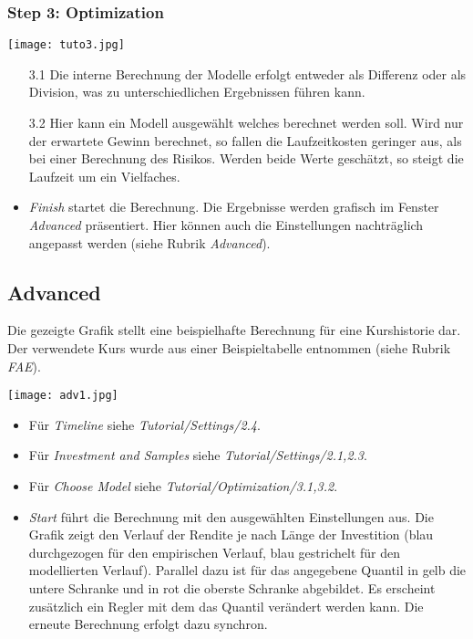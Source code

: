 \documentclass{scrartcl}
\begin{document}
\subsubsection*{Step 3: Optimization}
\begin{center}
\texttt{[image: tuto3.jpg]}
\end{center}

\begin{itemize}
\item[3.1]{Die interne Berechnung der Modelle erfolgt entweder als Differenz oder als Division, was zu unterschiedlichen Ergebnissen führen kann.}
\item[3.2]{Hier kann ein Modell ausgewählt welches berechnet werden soll. Wird nur der erwartete Gewinn berechnet, so fallen die Laufzeitkosten geringer aus, als bei einer Berechnung des Risikos. Werden beide Werte geschätzt, so steigt die Laufzeit um ein Vielfaches.}
\item{\textit{Finish} startet die Berechnung. Die Ergebnisse werden grafisch im Fenster \textit{Advanced} präsentiert. Hier können auch die Einstellungen nachträglich angepasst werden (siehe Rubrik \textit{Advanced}).}
\end{itemize}

\subsection{Advanced}

Die gezeigte Grafik stellt eine beispielhafte Berechnung für eine Kurshistorie dar. Der verwendete Kurs wurde aus einer Beispieltabelle entnommen (siehe Rubrik \textit{FAE}).

\begin{center}
\texttt{[image: adv1.jpg]}
\end{center}

\begin{itemize}
\item{Für \textit{Timeline} siehe \textit{Tutorial/Settings/2.4}.}
\item{Für \textit{Investment and Samples} siehe \textit{Tutorial/Settings/2.1,2.3}.}
\item{Für \textit{Choose Model} siehe \textit{Tutorial/Optimization/3.1,3.2}.}
\item{\textit{Start} führt die Berechnung mit den ausgewählten Einstellungen aus. Die Grafik zeigt den Verlauf der Rendite je nach Länge der Investition (blau durchgezogen für den empirischen Verlauf, blau gestrichelt für den modellierten Verlauf). Parallel dazu ist für das angegebene Quantil in gelb die untere Schranke und in rot die oberste Schranke abgebildet. Es erscheint zusätzlich ein Regler mit dem das Quantil verändert werden kann. Die erneute Berechnung erfolgt dazu synchron.}
\end{itemize}
\end{document}
